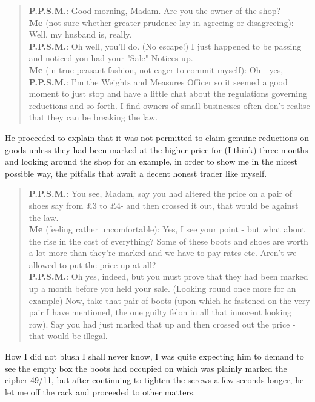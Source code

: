 \begin{quote}
\textbf{P.P.S.M.}: Good morning, Madam. Are you the owner of the shop? \\
\textbf{Me} (not sure whether greater prudence lay in agreeing or disagreeing):  Well, my husband is, really. \\
\textbf{P.P.S.M.}: Oh well, you’ll do. (No escape!) I just happened to be passing and noticed you had your "Sale" Notices up. \\
\textbf{Me} (in true peasant fashion, not eager to commit myself): Oh - yes, \\
\textbf{P.P.S.M.}:  I'm the Weights and Measures Officer so it seemed a good moment to just stop and have a little chat about the regulations governing reductions and so forth. I find owners of small businesses often don’t realise that they can be breaking the law. 
\end{quote}

He proceeded to explain that it was not permitted to claim genuine reductions on goods unless they had been marked at the higher price for (I think) three months and looking around the shop for an example, in order to show me in the nicest possible way, the pitfalls that await a decent honest trader like myself.

\begin{quote}
\textbf{P.P.S.M.}:  You see, Madam, say you had altered the price on a pair of shoes say from £3 to £4- and then crossed it out, that would be against the law. \\
\textbf{Me}  (feeling rather uncomfortable): Yes, I see your point - but what about the rise in the cost of everything? Some of these boots and shoes are worth a lot more than they’re marked and we have to pay rates etc. Aren’t we allowed to put the price up at all? \\
\textbf{P.P.S.M.}: Oh yes, indeed, but you must prove that they had been marked up a month before you held your sale. (Looking round once more for an example) Now, take that pair of boots (upon which he fastened on the very pair I have mentioned, the one guilty felon in all that innocent looking row). Say you had just marked that up and then crossed out the price - that would be illegal.
\end{quote}

How I did not blush I shall never know, I was quite expecting him to demand to see the empty box the boots had occupied on which was plainly marked the cipher 49/11, but after continuing to tighten the screws a few seconds longer, he let me off the rack and proceeded to other matters.

